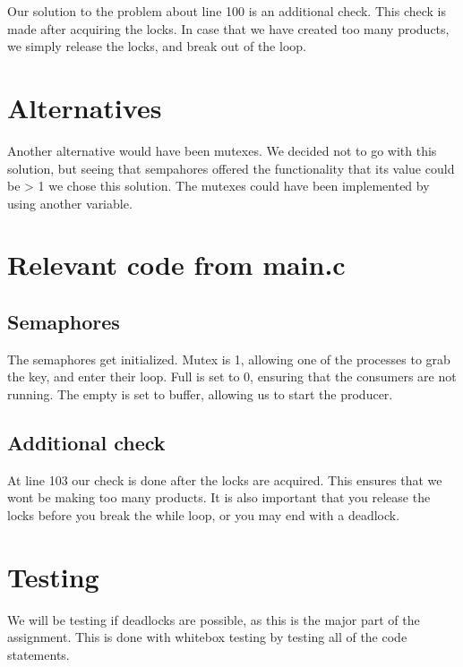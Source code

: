 Our solution to the problem about line 100 is an additional check. This check is made after acquiring the locks.
In case that we have created too many products, we simply release the locks, and break out of the loop. \\



\section{Alternatives}
Another alternative would have been mutexes. We decided not to go with this solution, but seeing that sempahores offered the functionality that its value could be > 1 we chose this solution. The mutexes could have been implemented by using another variable.

\section{Relevant code from main.c}
\subsection{Semaphores}
The semaphores get initialized.	
Mutex is 1, allowing one of the processes to grab the key, and enter their loop. Full is set to 0, ensuring that the consumers are not running. The empty is set to buffer, allowing us to start the producer.\\



\subsection{Additional check}
At line 103 our check is done after the locks are acquired. This ensures that we wont be making too many products. It is also important that you release the locks before you break the while loop, or you may end with a deadlock.




\section{Testing}

We will be testing if deadlocks are possible, as this is the major part of the assignment. This is done with whitebox testing by testing all of the code statements.\\


